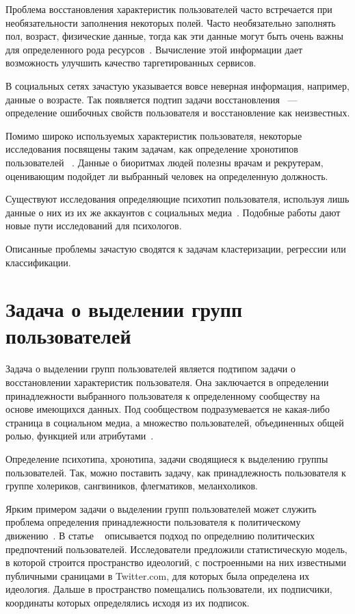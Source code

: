 \documentclass[annotation,times,page4]{itmo-student-thesis}
\begin{document}
Проблема восстановления характеристик пользователей часто встречается при необязательности заполнения некоторых полей. Часто необязательно заполнять пол, возраст, физические данные, тогда как эти данные могут быть очень важны для определенного рода ресурсов~\cite{peersman2011predicting, turdakov2013opredelenie, schwartz2013personality}. Вычисление этой информации дает возможность улучшить качество таргетированных сервисов.

В социальных сетях зачастую указывается вовсе неверная информация, например, данные о возрасте. Так появляется подтип задачи восстановления ~--- определение ошибочных свойств пользователя и восстановление как неизвестных.

Помимо широко используемых характеристик пользователя, некоторые исследования посвящены таким задачам, как определение хронотипов пользователей ~\cite{blachnio2015facebook}. Данные о биоритмах людей полезны врачам и рекрутерам, оценивающим подойдет ли выбранный человек на определенную должность.

Существуют исследования определяющие психотип пользователя, используя лишь данные о них из их же аккаунтов с социальных медиа~\cite{schwartz2013personality}. Подобные работы дают новые пути исследований для психологов.

Описанные проблемы зачастую сводятся к задачам кластеризации, регрессии или классификации.

\section{Задача о выделении групп пользователей}
Задача о выделении групп пользователей является подтипом задачи о восстановлении характеристик пользователя. Она заключается в определении принадлежности выбранного пользователя к определенному сообществу на основе имеющихся данных. Под сообществом подразумевается не какая-либо страница в социальном медиа, а множество пользователей, объединенных общей ролью, функцией или атрибутами~\cite{korshunov2013tasks}.

Определение психотипа, хронотипа, задачи сводящиеся к выделению группы пользователей. Так, можно поставить задачу, как принадлежность пользователя к группе холериков, сангвиников, флегматиков, меланхоликов.

Ярким примером задачи о выделении групп пользователей может служить проблема определения принадлежности пользователя к политическому движению~\cite{barbera2015tweeting, yardi2010dynamic, lo2014common, bonica2013ideology, gruzd2014investigating}. В статье ~\cite{barbera2015tweeting} описывается подход по определнию политических предпочтений пользователей. Исследователи предложили статистическую модель, в которой строится пространство идеологий, с построенными на них известными публичными сраницами в Twitter.com, для которых была определена их идеология. Дальше в пространство помещались пользователи, их подписчики, координаты которых определялись исходя из их подписок.
\end{document}

